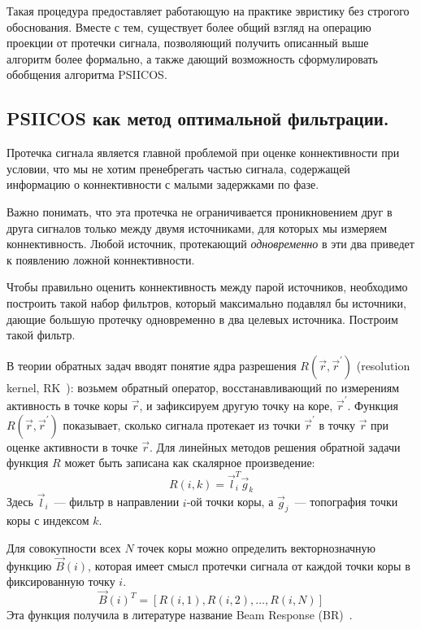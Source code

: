 Такая процедура предоставляет работающую на практике эвристику без строгого обоснования.
Вместе с тем, существует более общий взгляд на операцию проекции от протечки сигнала,
позволяющий получить описанный выше алгоритм более формально, а также дающий возможность
сформулировать обобщения алгоритма PSIICOS.\@

\subsection{PSIICOS как метод оптимальной фильтрации.}

Протечка сигнала является главной проблемой при оценке коннективности при
условии, что мы не хотим пренебрегать частью сигнала, содержащей информацию
о коннективности с малыми задержками по фазе.

Важно понимать, что эта протечка не ограничивается проникновением друг в друга
сигналов только между двумя источниками, для которых мы измеряем
коннективность. Любой источник, протекающий \emph{одновременно} в эти два приведет
к появлению ложной коннективности.

Чтобы правильно оценить коннективность между парой источников,
необходимо построить такой набор фильтров, который максимально
подавлял бы источники, дающие большую протечку одновременно в два
целевых источника. Построим такой фильтр.

В теории обратных задач вводят понятие ядра разрешения $R(\vec{r},
\vec{r}^{\prime})$ (resolution kernel, RK~\cite{Sekihara2007}): возьмем
обратный оператор, восстанавливающий по измерениям активность в точке коры
$\vec{r}$, и зафиксируем другую точку на коре, $\vec{r}^{\prime}$.  Функция
$R(\vec{r}, \vec{r}^{\prime})$ показывает, сколько сигнала протекает из точки
$\vec{r}^{\prime}$ в точку $\vec{r}$ при оценке активности в точке $\vec{r}$.
Для линейных методов решения обратной задачи функция $R$ может быть записана как
скалярное произведение:
\begin{equation}
    R(i, k) = \vec{l}_i^T \vec{g}_k
    \label{eq:resolution_kernel}
\end{equation}
Здесь $\vec{l}_i$~--- фильтр в направлении $i$-ой точки коры, а
$\vec{g}_j$~--- топография точки коры с индексом $k$.

Для совокупности всех $N$ точек коры можно определить векторнозначную функцию
$\vec{B}(i)$, которая имеет смысл протечки сигнала от каждой точки коры в
фиксированную точку $i$. 
\begin{equation}
    \vec{B}{(i)}^T = \left[R{(i, 1)}, R(i, 2), \ldots, R(i, N)\right]
\end{equation}
Эта функция получила в литературе название Beam Response (BR)~\cite{Sekihara2007}.


